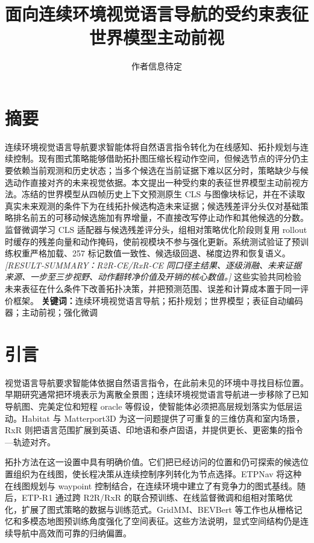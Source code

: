 \documentclass[UTF8,11pt]{ctexart}
\title{面向连续环境视觉语言导航的受约束表征世界模型主动前视}
\author{作者信息待定}
\date{}
\begin{document}
\maketitle

\section*{摘要}
连续环境视觉语言导航要求智能体将自然语言指令转化为在线感知、拓扑规划与连续控制。现有图式策略能够借助拓扑图压缩长程动作空间，但候选节点的评分仍主要依赖当前观测和历史状态；当多个候选在当前证据下难以区分时，策略缺少与候选动作直接对齐的未来视觉依据。本文提出一种受约束的表征世界模型主动前视方法。冻结的世界模型从四帧历史上下文预测原生 CLS 与图像块标记，并在不读取真实未来观测的条件下为在线拓扑候选构造未来证据；候选残差评分头仅对基础策略排名前五的可移动候选施加有界增量，不直接改写停止动作和其他候选的分数。监督微调学习 CLS 适配器与候选残差评分头，组相对策略优化阶段则复用 rollout 时缓存的残差向量和动作掩码，使前视模块不参与强化更新。系统测试验证了预训练权重严格加载、257 标记数值一致性、候选级回退、梯度边界和恢复语义。\textit{[RESULT-SUMMARY：R2R-CE/RxR-CE 同口径主结果、逐级消融、未来证据来源、一步至三步视野、动作翻转净价值及开销的核心数值。]} 这些实验共同检验未来表征在什么条件下改善拓扑决策，并把预测范围、误差和计算成本置于同一评价框架。
\noindent\textbf{关键词：}连续环境视觉语言导航；拓扑规划；世界模型；表征自动编码器；主动前视；强化微调

\section{引言}

视觉语言导航要求智能体依据自然语言指令，在此前未见的环境中寻找目标位置。早期研究通常把环境表示为离散全景图\cite{anderson2018r2r}；连续环境视觉语言导航进一步移除了已知导航图、完美定位和短程 oracle 等假设，使智能体必须把高层规划落实为低层运动\cite{krantz2020vlnce}。Habitat 与 Matterport3D 为这一问题提供了可重复的三维仿真和室内场景\cite{savva2019habitat,chang2017matterport}，RxR 则把语言范围扩展到英语、印地语和泰卢固语，并提供更长、更密集的指令—轨迹对齐\cite{ku2020rxr}。

拓扑方法在这一设置中具有明确价值。它们把已经访问的位置和仍可探索的候选位置组织为在线图，使长程决策从连续控制序列转化为节点选择。ETPNav 将这种在线图规划与 waypoint 控制结合，在连续环境中建立了有竞争力的图式基线\cite{an2025etpnav}。随后，ETP-R1 通过跨 R2R/RxR 的联合预训练、在线监督微调和组相对策略优化，扩展了图式策略的数据与训练范式\cite{ye2025etpr1}。GridMM、BEVBert 等工作也从栅格记忆和多模态地图预训练角度强化了空间表征\cite{wang2023gridmm,an2023bevbert}。这些方法说明，显式空间结构仍是连续导航中高效而可靠的归纳偏置。
\end{document}
